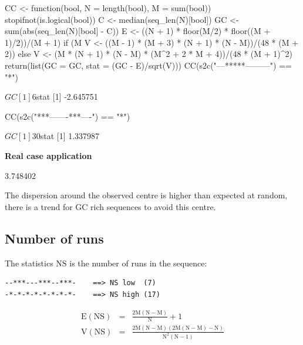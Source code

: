 \documentclass{article}
\begin{document}
\begin{Schunk}
\begin{Sinput}
 CC <- function(bool, N = length(bool), M = sum(bool)) {
     stopifnot(is.logical(bool))
     C <- median(seq_len(N)[bool])
     GC <- sum(abs(seq_len(N)[bool] - C))
     E <- ((N + 1) * floor(M/2) * floor((M + 1)/2))/(M + 1)
     if (M%
         V <- ((M - 1) * (M + 3) * (N + 1) * (N - M))/(48 * 
             (M + 2))
     else V <- (M * (N + 1) * (N - M) * (M^2 + 2 * M + 4))/(48 * 
         (M + 1)^2)
     return(list(GC = GC, stat = (GC - E)/sqrt(V)))
 }
 CC(s2c("---*****---------") == "*")
\end{Sinput}
\begin{Soutput}
$GC
[1] 6

$stat
[1] -2.645751
\end{Soutput}
\begin{Sinput}
 CC(s2c("***-------***----") == "*")
\end{Sinput}
\begin{Soutput}
$GC
[1] 30

$stat
[1] 1.337987
\end{Soutput}
\end{Schunk}

\noindent\textbf{Real case application}

\begin{Schunk}
\begin{Soutput}
[1] 3.748402
\end{Soutput}
\end{Schunk}

The dispersion around the observed centre is higher than expected at random, there is a trend for
GC rich sequences to avoid this centre.



\subsection{Number of runs}

The statistics $$ is the number of runs in the sequence:

\begin{verbatim}
--***---***--***-    ==> NS low  (7)
-*-*-*-*-*-*-*-*-    ==> NS high (17)
\end{verbatim}

\begin{eqnarray*}
\mathrm{E(NS)} & = & \mathrm{\frac{2M(N - M)}{N} + 1} \\
\mathrm{V(NS)} & = & \mathrm{\frac{2M(N - M)(2M(N - M) - N)}{N^2(N - 1)}}
\end{eqnarray*}
\end{document}
